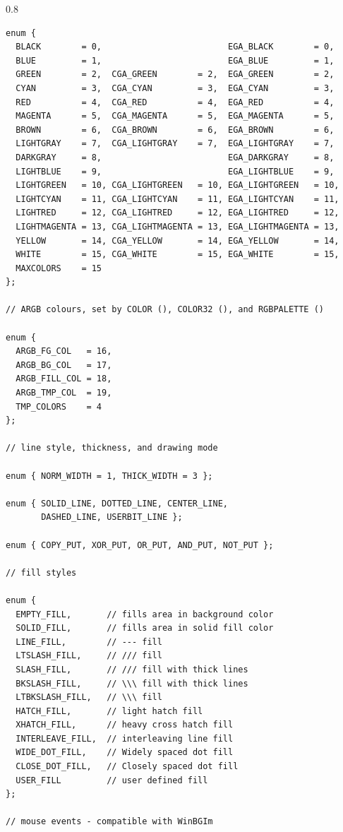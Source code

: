 \documentclass[a4paper,12pt]{article}
\newenvironment{margins}[2]
{ %
\begin{list}{}
{
\setlength{\leftmargin}{#1}
\setlength{\rightmargin}{#2}
} \item
} %
{\end{list}}
\begin{document}
\begin{margins}{-0.5cm}{-0.5cm}
\begin{spacing}{0.8}
\begin{lstlisting}
enum {
  BLACK        = 0,                         EGA_BLACK        = 0,
  BLUE         = 1,                         EGA_BLUE         = 1,
  GREEN        = 2,  CGA_GREEN        = 2,  EGA_GREEN        = 2,
  CYAN         = 3,  CGA_CYAN         = 3,  EGA_CYAN         = 3,
  RED          = 4,  CGA_RED          = 4,  EGA_RED          = 4,
  MAGENTA      = 5,  CGA_MAGENTA      = 5,  EGA_MAGENTA      = 5,
  BROWN        = 6,  CGA_BROWN        = 6,  EGA_BROWN        = 6,
  LIGHTGRAY    = 7,  CGA_LIGHTGRAY    = 7,  EGA_LIGHTGRAY    = 7,
  DARKGRAY     = 8,                         EGA_DARKGRAY     = 8,
  LIGHTBLUE    = 9,                         EGA_LIGHTBLUE    = 9,
  LIGHTGREEN   = 10, CGA_LIGHTGREEN   = 10, EGA_LIGHTGREEN   = 10,
  LIGHTCYAN    = 11, CGA_LIGHTCYAN    = 11, EGA_LIGHTCYAN    = 11,
  LIGHTRED     = 12, CGA_LIGHTRED     = 12, EGA_LIGHTRED     = 12,
  LIGHTMAGENTA = 13, CGA_LIGHTMAGENTA = 13, EGA_LIGHTMAGENTA = 13,
  YELLOW       = 14, CGA_YELLOW       = 14, EGA_YELLOW       = 14,
  WHITE        = 15, CGA_WHITE        = 15, EGA_WHITE        = 15,
  MAXCOLORS    = 15
};

// ARGB colours, set by COLOR (), COLOR32 (), and RGBPALETTE ()

enum {
  ARGB_FG_COL   = 16,
  ARGB_BG_COL   = 17,
  ARGB_FILL_COL = 18,
  ARGB_TMP_COL  = 19,
  TMP_COLORS    = 4
};

// line style, thickness, and drawing mode

enum { NORM_WIDTH = 1, THICK_WIDTH = 3 };

enum { SOLID_LINE, DOTTED_LINE, CENTER_LINE,
       DASHED_LINE, USERBIT_LINE };

enum { COPY_PUT, XOR_PUT, OR_PUT, AND_PUT, NOT_PUT };

// fill styles

enum {
  EMPTY_FILL,       // fills area in background color
  SOLID_FILL,       // fills area in solid fill color
  LINE_FILL,        // --- fill
  LTSLASH_FILL,     // /// fill
  SLASH_FILL,       // /// fill with thick lines
  BKSLASH_FILL,     // \\\ fill with thick lines
  LTBKSLASH_FILL,   // \\\ fill
  HATCH_FILL,       // light hatch fill
  XHATCH_FILL,      // heavy cross hatch fill
  INTERLEAVE_FILL,  // interleaving line fill
  WIDE_DOT_FILL,    // Widely spaced dot fill
  CLOSE_DOT_FILL,   // Closely spaced dot fill
  USER_FILL         // user defined fill
};

// mouse events - compatible with WinBGIm


\end{lstlisting}
\end{spacing}
\end{margins}
\end{document}

